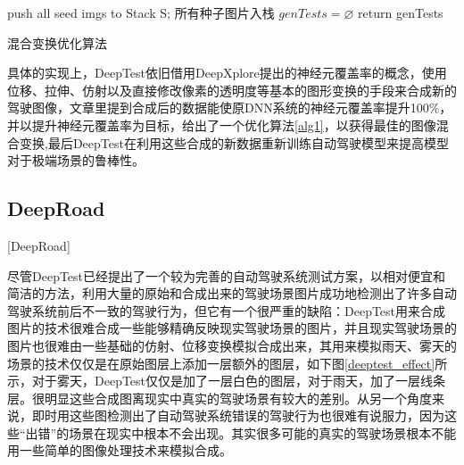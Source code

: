 \begin{algorithm}[h]
    \small
    \SetAlgoLined


    push all seed imgs to Stack S; 所有种子图片入栈\;
    $genTests = \varnothing$\;
    return genTests
    \caption{混合变换优化算法\cite{DeepTest}}
    \label{alg1}
\end{algorithm}

具体的实现上，DeepTest依旧借用DeepXplore提出的神经元覆盖率的概念，使用位移、拉伸、仿射以及直接修改像素的透明度等基本的图形变换的手段来合成新的驾驶图像，文章里提到合成后的数据能使原DNN系统的神经元覆盖率提升100\%\cite{DeepTest}，并以提升神经元覆盖率为目标，给出了一个优化算法\ref{alg1}，以获得最佳的图像混合变换,最后DeepTest在利用这些合成的新数据重新训练自动驾驶模型来提高模型对于极端场景的鲁棒性。

\subsection{DeepRoad}[DeepRoad]

尽管DeepTest已经提出了一个较为完善的自动驾驶系统测试方案，以相对便宜和简洁的方法，利用大量的原始和合成出来的驾驶场景图片成功地检测出了许多自动驾驶系统前后不一致的驾驶行为，但它有一个很严重的缺陷：DeepTest用来合成图片的技术很难合成一些能够精确反映现实驾驶场景的图片，并且现实驾驶场景的图片也很难由一些基础的仿射、位移变换模拟合成出来，其用来模拟雨天、雾天的场景的技术仅仅是在原始图层上添加一层额外的图层，如下图\ref{deeptest_effect}所示，对于雾天，DeepTest仅仅是加了一层白色的图层，对于雨天，加了一层线条层。很明显这些合成图离现实中真实的驾驶场景有较大的差别。从另一个角度来说，即时用这些图检测出了自动驾驶系统错误的驾驶行为也很难有说服力，因为这些“出错”的场景在现实中根本不会出现。其实很多可能的真实的驾驶场景根本不能用一些简单的图像处理技术来模拟合成。

